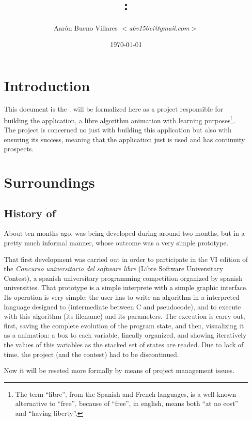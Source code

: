 \documentclass[twocolumn]{article}
\title{\fav: \favc}
\author{Aarón Bueno Villares \textit{$<$abv150ci@gmail.com$>$}}
\date{\today}
\begin{document}
\twocolumn[
\maketitle
]

\tableofcontents

\section{Introduction}
This document is the \favc. \favp will be formalized
here as a project responsible for building the \fav application, a
libre algorithm animation with learning purposes\footnote{The
  term ``libre'', from the Spanish and French languages, is a well-known
  alternative to ``free'', because of ``free'', in english, means both
  ``at no cost'' and ``having liberty''.}. The
project is concerned no just with building this
application but also with ensuring its success, meaning that the
application just is used and has continuity prospects.

\section{Surroundings}
\subsection{History of \fav}
About ten months ago, \fav was
being developed during around two months, but in a pretty much
informal manner, whose outcome was a very simple prototype.

That first \fav development was carried out in order to participate in the
VI edition of the \textit{Concurso universitario del software libre}
(Libre Software Universitary Contest), a spanish
universitary programming competition organized by spanish
universities. That prototype is a simple interprete with a simple
graphic interface. Its operation is very simple: the user has to write
an algorithm in a interpreted language designed to \fav (intermediate
between C and pseudocode), and to execute \fav with this algorithm
(its filename) and its parameters. The execution is carry out, first,
saving the complete evolution of the program state, and then,
visualizing it as a animation: a box to each variable, lineally
organized, and showing iteratively the values of this variables as the
stacked set of states are readed. Due to lack of time, the
project (and the contest) had to be discontinued.

Now it will be reseted more formally by means of project
management issues.
\end{document}
